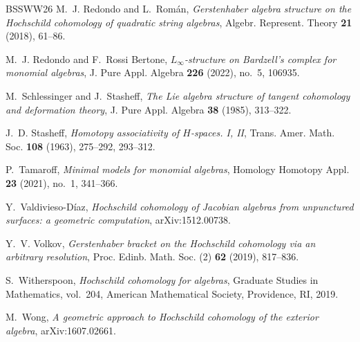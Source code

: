 \documentclass[11pt,a4paper,reqno]{amsart}
\theoremstyle{plain}
\theoremstyle{definition}
\numberwithin{equation}{section}
\begin{document}
\begin{thebibliography}{BSSWW26}
		M.~J. Redondo and L.~Rom\'an,
		\emph{Gerstenhaber algebra structure on the Hochschild cohomology of quadratic string algebras},
		Algebr. Represent. Theory \textbf{21} (2018), 61--86.
		
		M.~J. Redondo and F.~Rossi Bertone,
		\emph{$L_\infty$-structure on Bardzell's complex for monomial algebras},
		J. Pure Appl. Algebra \textbf{226} (2022), no.~5, 106935.
		
		M.~Schlessinger and J.~Stasheff,
		\emph{The Lie algebra structure of tangent cohomology and deformation theory},
		J. Pure Appl. Algebra \textbf{38} (1985), 313--322.
		
		J.~D. Stasheff,
		\emph{Homotopy associativity of $H$-spaces. I, II},
		Trans. Amer. Math. Soc. \textbf{108} (1963), 275--292, 293--312.
		
		P.~Tamaroff,
		\emph{Minimal models for monomial algebras},
		Homology Homotopy Appl. \textbf{23} (2021), no.~1, 341--366.
		
		Y.~Valdivieso-D\'iaz,
		\emph{Hochschild cohomology of Jacobian algebras from unpunctured surfaces:
			a geometric computation},
		arXiv:1512.00738.
		
		Y.~V. Volkov,
		\emph{Gerstenhaber bracket on the Hochschild cohomology via an arbitrary resolution},
		Proc. Edinb. Math. Soc. (2) \textbf{62} (2019), 817--836.
		
		S.~Witherspoon,
		\emph{Hochschild cohomology for algebras},
		Graduate Studies in Mathematics, vol.~204, American Mathematical Society, Providence, RI, 2019.
		
		M.~Wong,
		\emph{A geometric approach to Hochschild cohomology of the exterior algebra},
		arXiv:1607.02661.
		
	\end{thebibliography}
	
\end{document}
